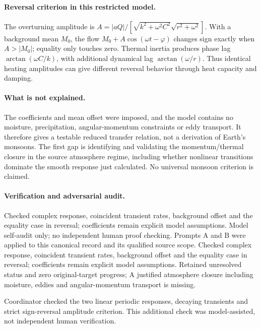 \documentclass[11pt]{article}
\begin{document}
\paragraph{Reversal criterion in this restricted model.} The overturning amplitude is $A=|aQ|/[\sqrt{k^2+\omega^2C^2}\sqrt{r^2+\omega^2}]$. With a background mean $M_0$, the flow $M_0+A\cos(\omega t-\varphi)$ changes sign exactly when $A>|M_0|$; equality only touches zero. Thermal inertia produces phase lag $\arctan(\omega C/k)$, with additional dynamical lag $\arctan(\omega/r)$. Thus identical heating amplitudes can give different reversal behavior through heat capacity and damping.

\paragraph{What is not explained.} The coefficients and mean offset were imposed, and the model contains no moisture, precipitation, angular-momentum constraints or eddy transport. It therefore gives a testable reduced transfer relation, not a derivation of Earth's monsoons. The first gap is identifying and validating the momentum/thermal closure in the source atmosphere regime, including whether nonlinear transitions dominate the smooth response just calculated. No universal monsoon criterion is claimed.

\paragraph{Verification and adversarial audit.}
Checked complex response, coincident transient rates, background offset and the equality case in reversal; coefficients remain explicit model assumptions. Model self-audit only; no independent human proof checking. Prompts A and B were applied to this canonical record and its qualified source scope. Checked complex response, coincident transient rates, background offset and the equality case in reversal; coefficients remain explicit model assumptions. Retained unresolved status and zero original-target progress; A justified atmosphere closure including moisture, eddies and angular-momentum transport is missing.

Coordinator checked the two linear periodic responses, decaying transients and strict sign-reversal amplitude criterion. This additional check was model-assisted, not independent human verification.
\end{document}
